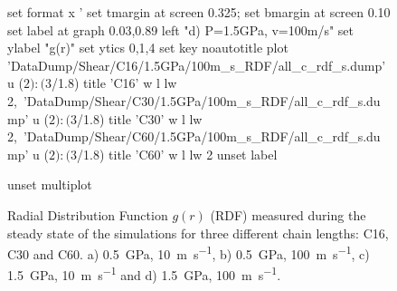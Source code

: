 \documentclass[5p]{elsarticle}
\begin{document}
\begin{figure}[htp]
\begin{center}
\begin{gnuplot}[terminal=epslatex, terminaloptions={size \SERFigwidth cm, \SERFigheight cm color solid}]
			set format x '%
			set tmargin at screen 0.325; set bmargin at screen 0.10
			set label at graph 0.03,0.89 left "d) P=1.5GPa, v=100m/s"
			set ylabel "g(r)"
			set ytics 0,1,4
			set key noautotitle
			plot  	'DataDump/Shear/C16/1.5GPa/100m_s_RDF/all_c_rdf_s.dump' u  ($2):($3/1.8) title  'C16' w l lw 2,\
		        	'DataDump/Shear/C30/1.5GPa/100m_s_RDF/all_c_rdf_s.dump' u  ($2):($3/1.8) title  'C30' w l lw 2,\
		        	'DataDump/Shear/C60/1.5GPa/100m_s_RDF/all_c_rdf_s.dump' u  ($2):($3/1.8) title  'C60' w l lw 2
	    	unset label

			unset multiplot
		\end{gnuplot}
		\caption{Radial Distribution Function $g(r)$ (RDF) measured during the steady state of the simulations for three different chain lengths: C16, C30 and C60. a) \SI{0.5}{\giga\pascal},  \SI{10}{\meter\per\second},   b) \SI{0.5}{\giga\pascal},  \SI{100}{\meter\per\second}, c) \SI{1.5}{\giga\pascal},  \SI{10}{\meter\per\second} and    d) \SI{1.5}{\giga\pascal},  \SI{100}{\meter\per\second}.
}
		\label{fig:RDF}
	\end{center}
 \end{figure}		
\end{document}
